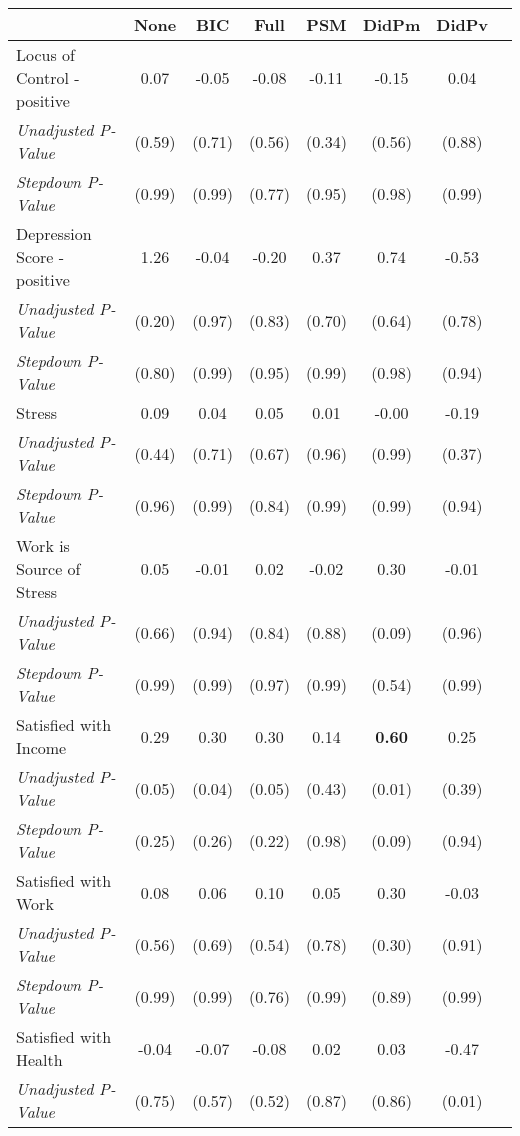 \begin{tabular}{l c c c c c c c}
\toprule
 & None & BIC & Full & PSM & DidPm & DidPv \\
\midrule
Locus of Control - positive & 0.07 & -0.05 & -0.08 & -0.11 & -0.15 & 0.04 \\
\quad \textit{Unadjusted P-Value} & (0.59) & (0.71) & (0.56) & (0.34) & (0.56) & (0.88) \\
\quad \textit{Stepdown P-Value} & (0.99) & (0.99) & (0.77) & (0.95) & (0.98) & (0.99) \\
Depression Score - positive & 1.26 & -0.04 & -0.20 & 0.37 & 0.74 & -0.53 \\
\quad \textit{Unadjusted P-Value} & (0.20) & (0.97) & (0.83) & (0.70) & (0.64) & (0.78) \\
\quad \textit{Stepdown P-Value} & (0.80) & (0.99) & (0.95) & (0.99) & (0.98) & (0.94) \\
Stress & 0.09 & 0.04 & 0.05 & 0.01 & -0.00 & -0.19 \\
\quad \textit{Unadjusted P-Value} & (0.44) & (0.71) & (0.67) & (0.96) & (0.99) & (0.37) \\
\quad \textit{Stepdown P-Value} & (0.96) & (0.99) & (0.84) & (0.99) & (0.99) & (0.94) \\
Work is Source of Stress & 0.05 & -0.01 & 0.02 & -0.02 & 0.30 & -0.01 \\
\quad \textit{Unadjusted P-Value} & (0.66) & (0.94) & (0.84) & (0.88) & (0.09) & (0.96) \\
\quad \textit{Stepdown P-Value} & (0.99) & (0.99) & (0.97) & (0.99) & (0.54) & (0.99) \\
Satisfied with Income & 0.29 & 0.30 & 0.30 & 0.14 & \textbf{ 0.60 } & 0.25 \\
\quad \textit{Unadjusted P-Value} & (0.05) & (0.04) & (0.05) & (0.43) & (0.01) & (0.39) \\
\quad \textit{Stepdown P-Value} & (0.25) & (0.26) & (0.22) & (0.98) & (0.09) & (0.94) \\
Satisfied with Work & 0.08 & 0.06 & 0.10 & 0.05 & 0.30 & -0.03 \\
\quad \textit{Unadjusted P-Value} & (0.56) & (0.69) & (0.54) & (0.78) & (0.30) & (0.91) \\
\quad \textit{Stepdown P-Value} & (0.99) & (0.99) & (0.76) & (0.99) & (0.89) & (0.99) \\
Satisfied with Health & -0.04 & -0.07 & -0.08 & 0.02 & 0.03 & -0.47 \\
\quad \textit{Unadjusted P-Value} & (0.75) & (0.57) & (0.52) & (0.87) & (0.86) & (0.01) \\

\end{tabular}
